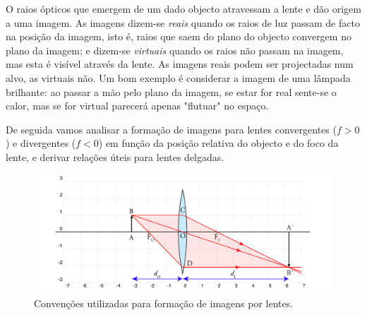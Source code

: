 \documentclass[a4paper,12pt]{article}      %
\begin{document}
O raios ópticos que emergem de um dado objecto atravessam a lente e dão origem a uma imagem. As imagens dizem-se \emph{reais} quando os raios de luz passam de facto na posição da imagem, isto é, raios que saem do plano do objecto convergem no plano da imagem; e dizem-se \emph{virtuais} quando os raios não passam na imagem, mas esta é visível através da lente. As imagens reais podem ser projectadas num alvo, as virtuais não. Um bom exemplo é considerar a imagem de uma lâmpada brilhante: ao passar a mão pelo plano da imagem, se estar for real sente-se o calor, mas se for virtual parecerá apenas "flutuar" no espaço.

De seguida vamos analisar a formação de imagens para lentes convergentes ($f>0$) e divergentes ($f<0$) em função da posição relativa do objecto e do foco da lente, e derivar relações úteis para lentes delgadas.



\begin{figure}
	[!htb]  \centering 
	\includegraphics[width=1.0\textwidth]{3-convencoes}
	\caption{Convenções utilizadas para formação de imagens por lentes. \label{fig:convencoes}} 
\end{figure}


\end{document}
